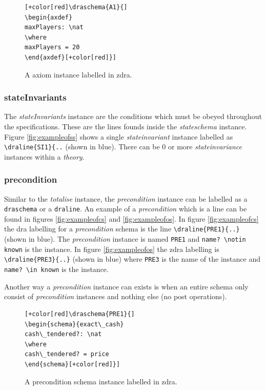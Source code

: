 \begin{figure}[H]
\centering
\begin{footnotesize}
\begin{BVerbatim}[commandchars=+\[\]]
[+color[red]\draschema{A1}{]
\begin{axdef}
maxPlayers: \nat
\where
maxPlayers = 20
\end{axdef}[+color[red]}]
\end{BVerbatim}
\end{footnotesize}
\caption{\label{fig:exampleofa} A axiom instance labelled in \gls{zdra}.}
\end{figure}

\subsubsection{stateInvariants}
The \emph{stateInvariants} instance are the conditions which must be obeyed throughout the specifications. These are the lines founds inside the \emph{stateschema} instance. Figure \ref{fig:exampleofss} shows a single \emph{stateinvariant} instance labelled as \verb|\draline{SI1}{..| (shown in blue). There can be 0 or more \emph{stateinvariance} instances within a \emph{theory}.

\subsubsection{precondition}

Similar to the \emph{totalise} instance, the \emph{precondition} instance can be labelled as a \verb|draschema| or a \verb|draline|. An example of a \emph{precondition} which is a line can be found in figures \ref{fig:exampleofcs} and \ref{fig:exampleofos}. In figure \ref{fig:exampleofcs} the \gls{dra} labelling for a \emph{precondition} schema is the line \verb|\draline{PRE1}{..}| (shown in blue). The \emph{precondition} instance is named \verb|PRE1| and \verb|name? \notin known| is the instance. In figure \ref{fig:exampleofos} the \gls{zdra} labelling is \verb|\draline{PRE3}{..}| (shown in blue) where \verb|PRE3| is the name of the instance and \verb|name? \in known| is the instance.

Another way a \emph{precondition} instance can exists is when an entire schema only consist of \emph{precondition} instances and nothing else (no post operations).

\begin{figure}[H]
\centering
\begin{footnotesize}
\begin{BVerbatim}[commandchars=+\[\]]
[+color[red]\draschema{PRE1}{]
\begin{schema}{exact\_cash}
cash\_tendered?: \nat
\where
cash\_tendered? = price
\end{schema}[+color[red]}]
\end{BVerbatim}
\end{footnotesize}
\caption{\label{fig:exampleofpre} A precondition schema instance labelled in \gls{zdra}.}
\end{figure}

